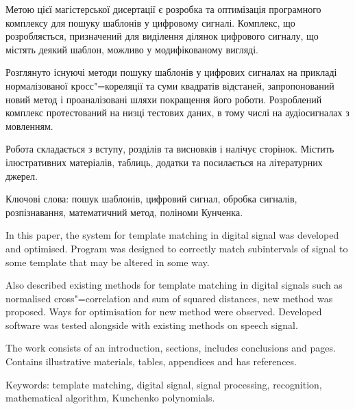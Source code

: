 Метою цієї магістерської дисертації є розробка та оптимізація програмного комплексу для пошуку шаблонів у цифровому
сигналі.
Комплекс, що розробляється, призначений для виділення ділянок цифрового сигналу, що містять деякий шаблон, можливо у
модифікованому вигляді.

Розглянуто існуючі методи пошуку шаблонів у цифрових сигналах на прикладі нормалізованої кросс"=кореляції та суми
квадратів відстаней, запропонований новий метод і проаналізовані шляхи покращення його роботи.
Розроблений комплекс протестований на низці тестових даних, в тому числі на аудіосигналах з мовленням.

Робота складається з вступу,   розділів та висновків і налічує  сторінок.
Містить  ілюстративних матеріалів,  таблиць,  додатки та
посилається на  літературних джерел.

Ключові слова: пошук шаблонів, цифровий сигнал, обробка сигналів, розпізнавання, математичний метод, поліноми
Кунченка.
\clearpage

In this paper, the system for template matching in digital signal was developed and optimised.
Program was designed to correctly match subintervals of signal to some template that may be altered in some way.

Also described existing methods for template matching in digital signals such as normalised cross"=correlation and sum
of squared distances, new method was proposed.
Ways for optimisation for new method were observed.
Developed software was tested alongside with existing methods on speech signal.

The work consists of an introduction,  sections, includes conclusions and  pages.
Contains  illustrative materials,  tables,  appendices and has
 references.

Keywords: template matching, digital signal, signal processing, recognition, mathematical algorithm, Kunchenko
polynomials.

